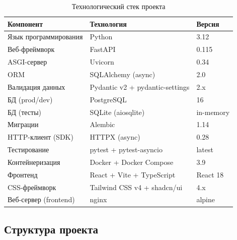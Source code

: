 \documentclass[12pt,a4paper]{article}
\begin{document}
\begin{table}[H]
\centering
\caption{Технологический стек проекта}
\begin{tabularx}{\textwidth}{|l|X|l|}
\hline
\textbf{Компонент} & \textbf{Технология} & \textbf{Версия} \\
\hline
Язык программирования & Python & 3.12 \\
\hline
Веб-фреймворк & FastAPI & 0.115 \\
\hline
ASGI-сервер & Uvicorn & 0.34 \\
\hline
ORM & SQLAlchemy (async) & 2.0 \\
\hline
Валидация данных & Pydantic v2 + pydantic-settings & 2.x \\
\hline
БД (prod/dev) & PostgreSQL & 16 \\
\hline
БД (тесты) & SQLite (aiosqlite) & in-memory \\
\hline
Миграции & Alembic & 1.14 \\
\hline
HTTP-клиент (SDK) & HTTPX (async) & 0.28 \\
\hline
Тестирование & pytest + pytest-asyncio & latest \\
\hline
Контейнеризация & Docker + Docker Compose & 3.9 \\
\hline
Фронтенд & React + Vite + TypeScript & React 18 \\
\hline
CSS-фреймворк & Tailwind CSS v4 + shadcn/ui & 4.x \\
\hline
Веб-сервер (frontend) & nginx & alpine \\
\hline
\end{tabularx}
\end{table}

\subsection{Структура проекта}
\end{document}
